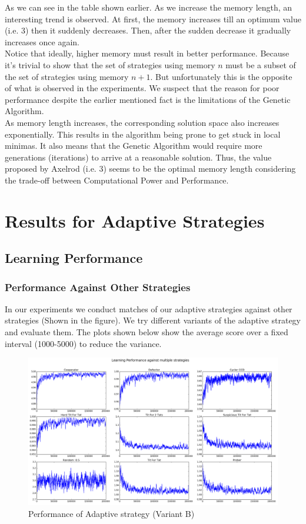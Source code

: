 \documentclass[a4paper]{article}
\begin{document}
	As we can see in the table shown earlier. As we increase the memory length, an interesting trend is observed. At first, the memory increases till an optimum value (i.e. 3) then it suddenly decreases. Then, after the sudden decrease it gradually increases once again.\\
	Notice that ideally, higher memory must result in better performance. Because it's trivial to show that the set of strategies using memory $n$ must be a subset of the set of strategies using memory $n+1$. But unfortunately this is the opposite of what is observed in the experiments. We suspect that the reason for poor performance despite the earlier mentioned fact is the limitations of the Genetic Algorithm.\\
	As memory length increases, the corresponding solution space also increases exponentially. This results in the algorithm being prone to get stuck in local minimas. It also means that the Genetic Algorithm would require more generations (iterations) to arrive at a reasonable solution. Thus, the value proposed by Axelrod (i.e. 3) seems to be the optimal memory length considering the trade-off between Computational Power and Performance.
	
	\section{Results for Adaptive Strategies}

	\subsection{Learning Performance}
		
	\subsubsection{Performance Against Other Strategies}
	
	In our experiments we conduct matches of our adaptive strategies against other strategies (Shown in the figure). We try different variants of the adaptive strategy and evaluate them. The plots shown below show the average score over a fixed interval (1000-5000) to reduce the variance. 
	
	\begin{figure}[H]
	\centering
	\includegraphics[width=\textwidth]{learnerB.png}
	\caption{{Performance of Adaptive strategy (Variant B)}}
	\end{figure}
\end{document}
